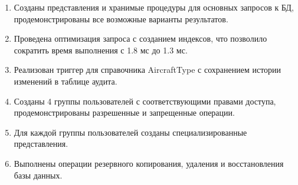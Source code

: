 \documentclass[a4paper,12pt]{article}
\begin{document}
\begin{enumerate}
    \item Созданы представления и хранимые процедуры для основных запросов к БД, продемонстрированы все возможные варианты результатов.
    \item Проведена оптимизация запроса с созданием индексов, что позволило сократить время выполнения с 1.8 мс до 1.3 мс.
    \item Реализован триггер для справочника AircraftType с сохранением истории изменений в таблице аудита.
    \item Созданы 4 группы пользователей с соответствующими правами доступа, продемонстрированы разрешенные и запрещенные операции.
    \item Для каждой группы пользователей созданы специализированные представления.
    \item Выполнены операции резервного копирования, удаления и восстановления базы данных.
\end{enumerate}
\end{document}
